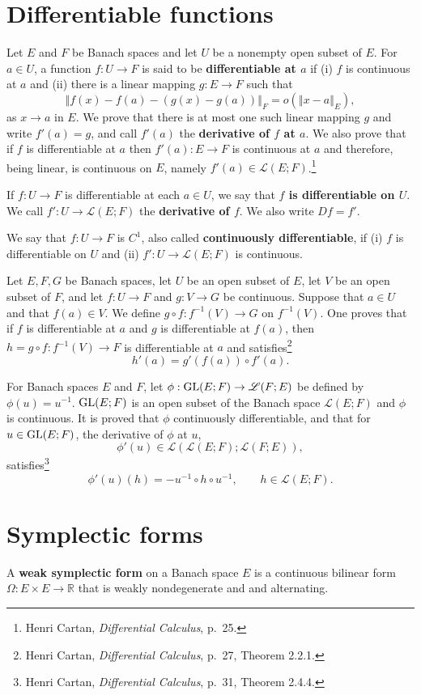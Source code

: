 \documentclass{article}
\newcommand{\GL}{\ensuremath\mathrm{GL}}
\newcommand{\norm}[1]{\left\Vert #1 \right\Vert}
\theoremstyle{definition}
\theoremstyle{definition}
\begin{document}
\section{Differentiable functions}
Let $E$ and $F$ be Banach spaces and  let $U$ be a nonempty open subset of $E$.
For $a \in U$, a function $f:U \to F$  is said to be \textbf{differentiable at $a$} if (i) $f$ is continuous at $a$ and (ii)
there is a linear mapping $g:E \to F$ such that
\[
\norm{f(x)-f(a)-(g(x)-g(a))}_F = o(\norm{x-a}_E),
\]
as $x \to a$ in $E$. 
We prove that there is at most one such linear mapping $g$ and write $f'(a)=g$, and call $f'(a)$ the \textbf{derivative of $f$ at $a$}.
 We also prove that
if $f$ is differentiable at $a$ then $f'(a):E \to F$ is continuous at $a$ and therefore, being linear, is continuous on $E$, namely
$f'(a) \in \mathscr{L}(E;F)$.\footnote{Henri Cartan, {\em Differential Calculus}, p.~25.}

If $f:U \to F$ is differentiable at each $a \in U$, we say that \textbf{$f$ is differentiable on $U$}.
We call $f':U \to \mathscr{L}(E;F)$ the \textbf{derivative of $f$}. We also write $Df=f'$.

We say that $f:U \to F$ is $C^1$, also called \textbf{continuously differentiable}, if (i) $f$ is differentiable on $U$ and (ii) $f':U \to \mathscr{L}(E;F)$ is continuous.

Let $E,F,G$ be Banach spaces, let $U$ be an open subset of $E$,  let $V$ be an open subset of $F$, and let
$f:U \to F$ and $g:V \to G$ be continuous. Suppose that $a \in U$ and that $f(a) \in V$. We define
$g \circ f:f^{-1}(V) \to G$ on $f^{-1}(V)$. One proves that if $f$ is differentiable at $a$ and $g$ is differentiable at $f(a)$, then
$h=g \circ f:f^{-1}(V) \to F$ is differentiable at $a$ and satisfies\footnote{Henri Cartan, {\em Differential Calculus}, p.~27, Theorem 2.2.1.}
\[
h'(a) = g'(f(a)) \circ f'(a).
\]

For Banach spaces $E$ and $F$, 
let $\phi:\GL(E;F) \to \mathscr{L}(F;E)$ be defined by $\phi(u)=u^{-1}$. $\GL(E;F)$ is an open subset of
the Banach space $\mathscr{L}(E;F)$ and
 $\phi$ is continuous. It is proved that $\phi$ continuously differentiable, and that for $u \in \GL(E;F)$,
the derivative of $\phi$ at $u$,
\[
\phi'(u) \in \mathscr{L}(\mathscr{L}(E;F);  \mathscr{L}(F;E)),
\]
 satisfies\footnote{Henri Cartan, {\em Differential Calculus}, p.~31, Theorem 2.4.4.}
 \[
 \phi'(u)(h) = -u^{-1} \circ h \circ u^{-1}, \qquad h \in \mathscr{L}(E;F).
 \]



\section{Symplectic forms}
A \textbf{weak symplectic form} on a Banach space $E$ is a continuous bilinear form $\Omega:E \times E \to \mathbb{R}$ that is weakly nondegenerate and 
and alternating. 
\end{document}
